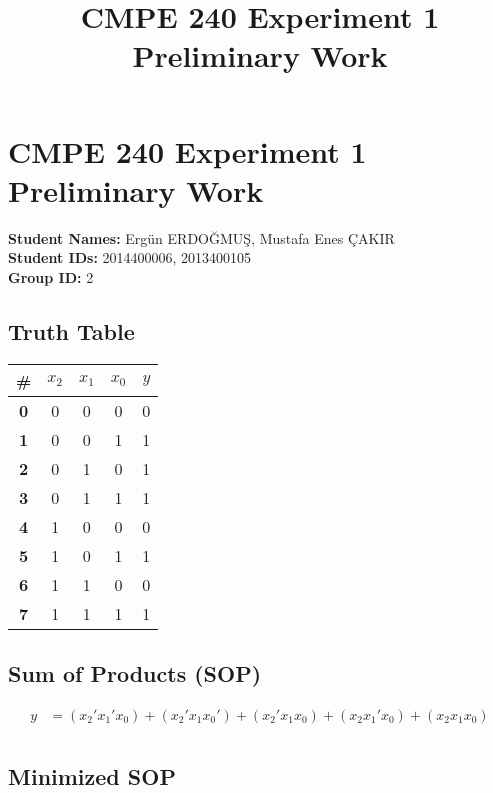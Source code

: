 \documentclass[12pt,a4paper]{report}
\title{CMPE 240 Experiment 1 Preliminary Work}
\begin{document}
\section*{CMPE 240 Experiment 1 Preliminary Work}

\noindent
\textbf{Student Names:} Ergün ERDOĞMUŞ, Mustafa Enes ÇAKIR \\
\textbf{Student IDs:} 2014400006, 2013400105 \\
\textbf{Group ID:} 2

\subsection*{Truth Table}

\begin{center}
	\begin{tabular}{|c|ccc|c|}
		\hline
		\textbf{\#} & \textbf{$x_2$} & \textbf{$x_1$} &\textbf{$x_0$} & \textbf{$y$} \\
		\hline
		\textbf{0} & 0 & 0 & 0 & 0 \\
		\hline
		\textbf{1} & 0 & 0 & 1 & 1 \\
		\hline
		\textbf{2} & 0 & 1 & 0 & 1 \\
		\hline
		\textbf{3} & 0 & 1 & 1 & 1 \\
		\hline
		\textbf{4} & 1 & 0 & 0 & 0 \\
		\hline
		\textbf{5} & 1 & 0 & 1 & 1 \\
		\hline
		\textbf{6} & 1 & 1 & 0 & 0 \\
		\hline
		\textbf{7} & 1 & 1 & 1 & 1 \\
		\hline
	\end{tabular}
\end{center}

\subsection*{Sum of Products (SOP)}

\begin{align*}
	y & = (x_2' x_1' x_0) + (x_2' x_1 x_0') + (x_2' x_1 x_0) + (x_2 x_1' x_0) + (x_2 x_1 x_0)\\
\end{align*}

\subsection*{Minimized SOP}
\end{document}

